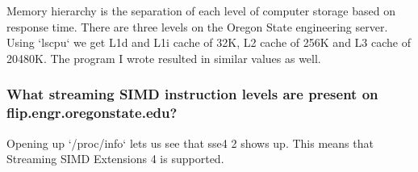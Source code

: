 \documentclass[letterpaper,10pt,titlepage]{article}
\begin{document}
Memory hierarchy is the separation of each level of computer storage based on response time. There are three levels on the Oregon State engineering server. Using `lscpu` we get L1d and L1i cache of 32K, L2 cache of 256K and L3 cache of 20480K. The program I wrote resulted in similar values as well.

\subsubsection*{What streaming SIMD instruction levels are present on flip.engr.oregonstate.edu?}

Opening up `/proc/info` lets us see that sse4 2 shows up. This means that Streaming SIMD Extensions 4 is supported.
\end{document}
